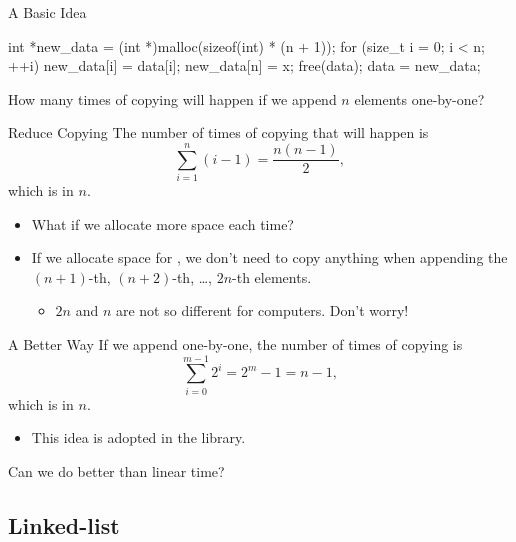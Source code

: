 \documentclass{beamer}
\begin{document}
\begin{frame}[fragile]{A Basic Idea}
    \begin{cpp}
int *new_data = (int *)malloc(sizeof(int) * (n + 1));
for (size_t i = 0; i < n; ++i)
  new_data[i] = data[i];
new_data[n] = x;
free(data);
data = new_data;
    \end{cpp}
    \pause
    \begin{question}
        How many times of copying will happen if we append \(n\) elements one-by-one?
    \end{question}
\end{frame}

\begin{frame}{Reduce Copying}
    The number of times of copying that will happen is
    \[\sum_{i=1}^n(i-1)=\frac{n(n-1)}2,\]
    which is  in \(n\). 
    \pause
    \begin{itemize}
        \item What if we allocate more space each time?
        \pause
        \item If we allocate space for , we don't need to copy anything when appending the \((n+1)\)-th, \((n+2)\)-th, \dots, \(2n\)-th elements.
        \pause
        \begin{itemize}
            \item \(2n\) and \(n\) are not so different for computers. Don't worry!
        \end{itemize}
    \end{itemize}
\end{frame}

\begin{frame}{A Better Way}
    If we append  one-by-one, the number of times of copying is
    \[\sum_{i=0}^{m-1}2^i=2^m-1=n-1,\]
    which is  in \(n\).
    \begin{itemize}
        \item This idea is adopted in the  library.
    \end{itemize}
    \pause
    \begin{question}
        Can we do better than linear time?
    \end{question}
\end{frame}

\subsection{Linked-list}
\end{document}
